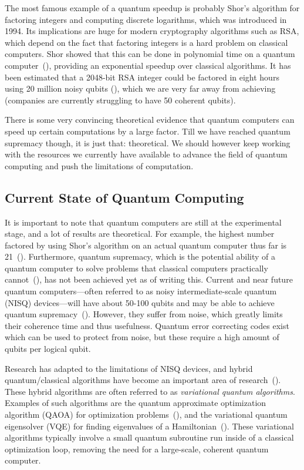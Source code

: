 \documentclass[a4paper,10pt]{article}
\begin{document}
The most famous example of a quantum speedup is probably Shor's algorithm for factoring integers and computing discrete logarithms, which was introduced in 1994.
Its implications are huge for modern cryptography algorithms such as RSA, which depend on the fact that factoring integers is a hard problem on classical computers.
Shor showed that this can be done in polynomial time on a quantum computer~(\cite{shor-factoring}), providing an exponential speedup over classical algorithms. 
It has been estimated that a 2048-bit RSA integer could be factored in eight hours using 20 million noisy qubits (\cite{shor-20mil}), which we are very far away from achieving (companies are currently struggling to have 50 coherent qubits).

There is some very convincing theoretical evidence that quantum computers can speed up certain computations by a large factor.
Till we have reached quantum supremacy though, it is just that: theoretical.
We should however keep working with the resources we currently have available to advance the field of quantum computing and push the limitations of computation.

\subsection{Current State of Quantum Computing}
It is important to note that quantum computers are still at the experimental stage, and a lot of results are theoretical.
For example, the highest number factored by using Shor's algorithm on an actual quantum computer thus far is 21~(\cite{shor-21}).
Furthermore, quantum supremacy, which is the potential ability of a quantum computer to solve problems that classical computers practically cannot~(\cite{preskill-qc}), has not been achieved yet as of writing this.
Current and near future quantum computers---often referred to as noisy intermediate-scale quantum (NISQ) devices---will have about 50-100 qubits and may be able to achieve quantum supremacy~(\cite{preskill-nisq}).
However, they suffer from noise, which greatly limits their coherence time and thus usefulness.
Quantum error correcting codes exist which can be used to protect from noise, but these require a high amount of qubits per logical qubit.

Research has adapted to the limitations of NISQ devices, and hybrid quantum/classical algorithms have become an important area of research~(\cite{mcclean2016theory}).
These hybrid algorithms are often referred to as \emph{variational quantum algorithms}.
Examples of such algorithms are the quantum approximate optimization algorithm (QAOA) for optimization problems~(\cite{qaoa}), and the variational quantum eigensolver (VQE) for finding eigenvalues of a Hamiltonian~(\cite{vqe}).
These variational algorithms typically involve a small quantum subroutine run inside of a classical optimization loop, removing the need for a large-scale, coherent quantum computer.
\end{document}
